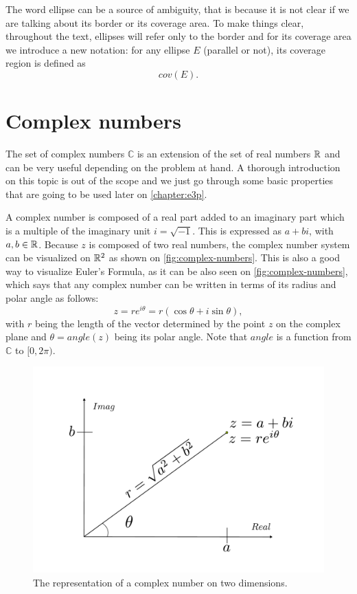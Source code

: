 The word ellipse can be a source of ambiguity, that is because it is not clear if we are talking about its border or its coverage area. To make things clear, throughout the text, ellipses will refer only to the border and for its coverage area we introduce a new notation: for any ellipse $E$ (parallel or not), its coverage region is defined as
\begin{equation}
cov(E).
\end{equation}

\section{Complex numbers}

The set of complex numbers $\mathbb{C}$ is an extension of the set of real numbers $\mathbb{R}$ and can be very useful depending on the problem at hand. A thorough introduction on this topic is out of the scope and we just go through some basic properties that are going to be used later on \autoref{chapter:e3p}.

A complex number is composed of a real part added to an imaginary part which is a multiple of the imaginary unit $i = \sqrt{-1}$. This is expressed as $a + bi$, with $a, b \in \mathbb{R}$. Because $z$ is composed of two real numbers, the complex number system can be visualized on $\mathbb{R}^2$ as shown on \autoref{fig:complex-numbers}. This is also a good way to visualize Euler's Formula, as it can be also seen on \autoref{fig:complex-numbers}, which says that any complex number can be written in terms of its radius and polar angle as follows:
\begin{equation}
z = re^{i\theta}=r(\cos{\theta} + i\sin{\theta}),
\end{equation}
with $r$ being the length of the vector determined by the point $z$ on the complex plane and $\theta = angle(z)$ being its polar angle. Note that $angle$ is a function from $\mathbb{C}$ to $[0, 2\pi)$.
\begin{figure}[ht]
	\centering
	\def\svgwidth{\columnwidth}
	\includegraphics[scale=.4]{tex/figures/complex_numbers}
	\caption{The representation of a complex number on two dimensions.}
	\label{fig:complex-numbers}
\end{figure}

